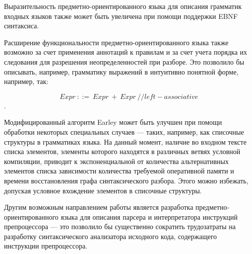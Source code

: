 Выразительность предметно-ориентированного языка для описания грамматик входных языков также может быть увеличена при помощи поддержки EBNF синтаксиса.

Расширение функциональности предметно-ориентированного языка также возможно за счет применения аннотаций к правилам и за счет учета порядка их следования для разрешения неопределенностей при разборе. Это позволило бы описывать, например, грамматику выражений в интуитивно понятной форме, например, так: 

$$Expr\ ::=\ Expr\ +\ Expr\ //left-associative$$.

Модифицированный алгоритм Earley может быть улучшен при помощи обработки некоторых специальных случаев --- таких, например, как списочные структуры в грамматиках языка. На данный момент, наличие во входном тексте списка элементов, элементы которого находятся в различных ветвях условной компиляции, приводит к экспоненциальной от количества альтернативных элементов списка зависимости количества требуемой оперативной памяти и времени восстановления графа синтаксического разбора. Этого можно избежать, допуская условное вхождение элементов в списочные структуры.

Другим возможным направлением работы является разработка предметно-ориентированного языка для описания парсера и интерпретатора инструкций препроцессора --- это позволило бы существенно сократить трудозатраты на разработку синтаксического анализатора исходного кода, содержащего инструкции препроцессора.

